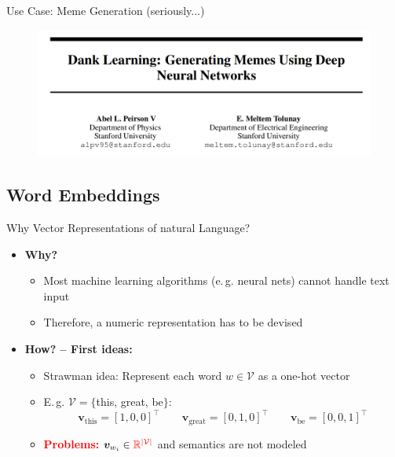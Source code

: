 \begin{frame}{Use Case: Meme Generation (seriously...)}{}
	\begin{figure}
		\centering
		\includegraphics[scale=0.50]{10_deep_learning/02_img/meme_generation}
	\end{figure}
\end{frame}


\subsection{Word Embeddings}

\begin{frame}{Why Vector Representations of natural Language?}{}
	\begin{itemize}
		\item \textbf{Why?}
		\begin{itemize}
			\item Most machine learning algorithms (e.\,g. neural nets) cannot handle text input
			\item Therefore, a numeric representation has to be devised
		\end{itemize}
		\item{\textbf{How? -- First ideas:}}
		\begin{itemize}
			\item Strawman idea: Represent each word $w \in \mathcal{V}$ as a one-hot vector
			\item E.\,g. $\mathcal{V} = \{$this, great, be$\}$:
			\begin{equation*}	
				\bm{v}_{\text{this}} = [1,0,0]^{\intercal} \qquad
				\bm{v}_{\text{great}} = [0,1,0]^{\intercal} \qquad
				\bm{v}_{\text{be}} = [0,0,1]^{\intercal}
			\end{equation*}
			\item \textcolor{red}{\textbf{Problems:}} $\bm{v}_{w_i} \in \textcolor{red}{\mathbb{R}^{\vert \mathcal{V} \vert}}$
			 	and semantics are not modeled
		\end{itemize}
	\end{itemize}
\end{frame}


